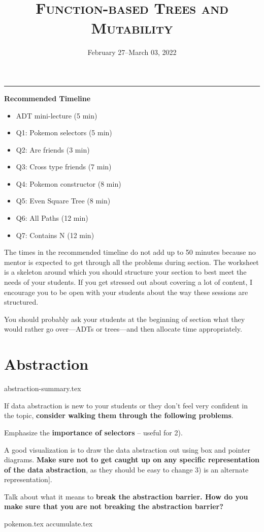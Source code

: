 \documentclass{exam}
\title{\textsc{Function-based Trees and Mutability}}
\date{February 27--March 03, 2022}
\begin{document}
\maketitle
\rule{\textwidth}{0.15em}
\fontsize{12}{15}\selectfont


\begin{meta}
\textbf{Recommended Timeline}
\begin{itemize}
    \item ADT mini-lecture (5 min)
    \item Q1: Pokemon selectors (5 min)
    \item Q2: Are friends (3 min)
    \item Q3: Cross type friends (7 min)
    \item Q4: Pokemon constructor (8 min)
    \item Q5: Even Square Tree (8 min)
    \item Q6: All Paths (12 min)
    \item Q7: Contains N (12 min)
\end{itemize}
The times in the recommended timeline do not add up to 50 minutes because no mentor
is expected to get through all the problems during section. The worksheet is a skeleton
around which you should structure your section to best meet the needs of your students.
If you get stressed out about covering a lot of content, I encourage you to be open with
your students about the way these sessions are structured.  

You should probably ask your students at the beginning of section what they would rather go
over---ADTs or trees---and then allocate time appropriately. 
\end{meta}


\section{Abstraction}
{abstraction-summary.tex}
\begin{meta}
    If data abstraction is new to your students or they don't feel very confident in the topic, \textbf{consider walking them through the following problems}.
    
    Emphasize the \textbf{importance of selectors} -- useful for 2).
    
    A good visualization is to draw the data abstraction out using box and pointer diagrams. \textbf{Make sure not to get caught up on any specific representation of the data abstraction}, as they should be easy to change 3) is an alternate representation].
    
    Talk about what it means to \textbf{break the abstraction barrier. How do you make sure that you are not breaking the abstraction barrier?}
    \end{meta}
\begin{questions}
    {pokemon.tex}
    {accumulate.tex}
\end{questions}
\end{document}
